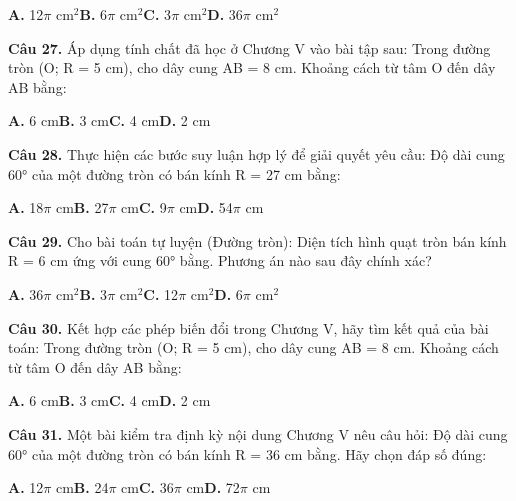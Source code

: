 \documentclass[11pt,a4paper]{article}
\begin{document}
\hspace*{1.5em}\textbf{A.} 12$\pi$ cm$^2$\quad\quad \textbf{B.} 6$\pi$ cm$^2$\quad\quad \textbf{C.} 3$\pi$ cm$^2$\quad\quad \textbf{D.} 36$\pi$ cm$^2$\par\vspace{2pt}
\textbf{\color{primary} Câu 27.} Áp dụng tính chất đã học ở Chương V vào bài tập sau: Trong đường tròn (O; R = 5 cm), cho dây cung AB = 8 cm. Khoảng cách từ tâm O đến dây AB bằng:\par
\hspace*{1.5em}\textbf{A.} 6 cm\quad\quad \textbf{B.} 3 cm\quad\quad \textbf{C.} 4 cm\quad\quad \textbf{D.} 2 cm\par\vspace{2pt}
\textbf{\color{primary} Câu 28.} Thực hiện các bước suy luận hợp lý để giải quyết yêu cầu: Độ dài cung 60° của một đường tròn có bán kính R = 27 cm bằng:\par
\hspace*{1.5em}\textbf{A.} 18$\pi$ cm\quad\quad \textbf{B.} 27$\pi$ cm\quad\quad \textbf{C.} 9$\pi$ cm\quad\quad \textbf{D.} 54$\pi$ cm\par\vspace{2pt}
\textbf{\color{primary} Câu 29.} Cho bài toán tự luyện (Đường tròn): Diện tích hình quạt tròn bán kính R = 6 cm ứng với cung 60° bằng. Phương án nào sau đây chính xác?\par
\hspace*{1.5em}\textbf{A.} 36$\pi$ cm$^2$\quad\quad \textbf{B.} 3$\pi$ cm$^2$\quad\quad \textbf{C.} 12$\pi$ cm$^2$\quad\quad \textbf{D.} 6$\pi$ cm$^2$\par\vspace{2pt}
\textbf{\color{primary} Câu 30.} Kết hợp các phép biến đổi trong Chương V, hãy tìm kết quả của bài toán: Trong đường tròn (O; R = 5 cm), cho dây cung AB = 8 cm. Khoảng cách từ tâm O đến dây AB bằng:\par
\hspace*{1.5em}\textbf{A.} 6 cm\quad\quad \textbf{B.} 3 cm\quad\quad \textbf{C.} 4 cm\quad\quad \textbf{D.} 2 cm\par\vspace{2pt}
\textbf{\color{primary} Câu 31.} Một bài kiểm tra định kỳ nội dung Chương V nêu câu hỏi: Độ dài cung 60° của một đường tròn có bán kính R = 36 cm bằng. Hãy chọn đáp số đúng:\par
\hspace*{1.5em}\textbf{A.} 12$\pi$ cm\quad\quad \textbf{B.} 24$\pi$ cm\quad\quad \textbf{C.} 36$\pi$ cm\quad\quad \textbf{D.} 72$\pi$ cm\par\vspace{2pt}
\end{document}
